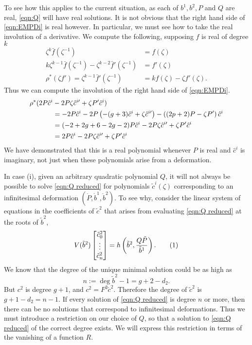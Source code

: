 \documentclass{article}
\begin{document}
To see how this applies to the current situation, as each of $b^1,b^2,P$ and $Q$ are real, \eqref{eqn:Q} will have real solutions. It is not obvious that the right hand side of \eqref{eqn:EMPDi} is real however. In particular, we must see how to take the real involution of a derivative. We compute the following, supposing $f$ is real of degree $k$
\begin{align*}
\zeta^k \bar{f}(\zeta^{-1}) &= f(\zeta) \\
k\zeta^{k-1} \bar{f}(\zeta^{-1}) - \zeta^{k-2} \bar{f}'(\zeta^{-1}) &= f'(\zeta) \\
\rho^*(\zeta f') = \zeta^{k-1}\bar{f}'(\zeta^{-1}) &= k f(\zeta) - \zeta f'(\zeta).
\end{align*}
Thus we can compute the involution of the right hand side of \eqref{eqn:EMPDi}.
\begin{align*}
\rho^*( 2P\hat{c}^i &- 2P\zeta\hat{c}^{i\prime} + \zeta P'\hat{c}^i ) \\
&= -2P\hat{c}^i - 2P\left(-(g+3)\hat{c}^i + \zeta\hat{c}^{i\prime}\right) - \left((2p+2)P - \zeta P'\right)\hat{c}^i \\
&= (-2+2g+6-2g-2)P\hat{c}^i - 2P\zeta\hat{c}^{i\prime} + \zeta P'\hat{c}^i \\
&= 2P\hat{c}^i - 2P\zeta\hat{c}^{i\prime} + \zeta P'\hat{c}^i
\end{align*}
We have demonstrated that this is a real polynomial whenever $P$ is real and $\hat{c}^i$ is imaginary, not just when these polynomials arise from a deformation.

In case (i), given an arbitrary quadratic polynomial $Q$, it will not always be possible to solve \eqref{eqn:Q reduced} for polynomials $\tilde{c}^i(\zeta)$ corresponding to an infinitesimal deformation $(\dot{P},\dot{b}^1,\dot{b}^2)$. To see why, consider the linear system of equations in the coefficients of $\tilde{c}^2$ that arises from evaluating \eqref{eqn:Q reduced} at the roots of $\tilde{b}^2$,
\[
V(\tilde{b}^2)
\begin{bmatrix}
\tilde{c}^2_0 \\ \vdots \\ \tilde{c}^2_n
\end{bmatrix}
=
h\bra{\tilde{b}^2, \frac{Q\tilde{P}}{\tilde{b}^1} }.
\labelthis{eqn:Q reduced linear}
\]
We know that the degree of the unique minimal solution could be as high as
\[
n := \deg \tilde{b}^2 - 1 = g + 2 - d_2.
\]
But $c^2$ is degree $g+1$, and $c^2 = F^2\tilde{c}^2$. Therefore the degree of $\tilde{c}^2$ is $g + 1 - d_2 = n-1$. If every solution of \eqref{eqn:Q reduced} is degree $n$ or more, then there can be no solutions that correspond to infinitesimal deformations. Thus we must introduce a restriction on our choice of $Q$, so that a solution to \eqref{eqn:Q reduced} of the correct degree exists. We will express this restriction in terms of the vanishing of a function $R$.
\end{document}
